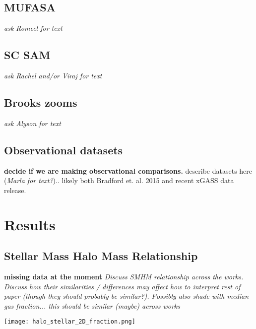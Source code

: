 \documentclass[fleqn,usenatbib]{mnras}
\begin{document}
\subsection{MUFASA}
\label{sec:MUFASA method}
{\it ask Romeel for text}

\subsection{SC SAM}
\label{sec:SC-SAM method}
{\it ask Rachel and/or Viraj for text}

\subsection{Brooks zooms}
\label{sec:Brooks method}
{\it ask Alyson for text}

\subsection{Observational datasets}
\label{sec:observational data}
{\bf decide if we are making observational comparisons.} describe datasets here ({\it Marla for text?}).. likely both Bradford et. al. 2015 and recent xGASS data release.

\section{Results}
\label{sec:results}

\subsection{Stellar Mass Halo Mass Relationship}
\label{sec:results:SMHM}
{\bf missing data at the moment}
{\it Discuss SMHM relationship across the works. Discuss how their similarities / differences may affect how to interpret rest of paper (though they should probably be similar?).  Possibly also shade with median gas fraction... this should be similar (maybe) across works}

\begin{figure*}
\texttt{[image: halo\_stellar\_2D\_fraction.png]}
\caption{The stellar mass halo mass relationship for the full population of galaxies across datasets. Shading indicates the fraction of galaxies within a given bin.}
\label{fig:fgas mstar 2D}
\end{figure*}
\end{document}
